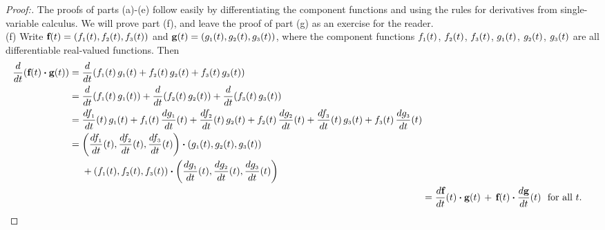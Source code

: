 \begin{proofbar}\vspace{-3mm}\begin{proof}[Proof:]
 The proofs of parts (a)-(e) follow easily by differentiating the component functions and using the rules for
 derivatives from single-variable calculus. We will prove part (f), and leave the proof of part (g) as an exercise for
 the reader.\vspace{1mm}\\(f)
 Write $\textbf{f}(t) = ( f_{\scriptscriptstyle 1}(t),f_{\scriptscriptstyle 2}(t),f_{\scriptscriptstyle 3}(t) )$ and
 $\textbf{g}(t) = ( g_{\scriptscriptstyle 1}(t),g_{\scriptscriptstyle 2}(t),g_{\scriptscriptstyle 3}(t) )$, where the component functions
 $f_{\scriptscriptstyle 1}(t)$, $f_{\scriptscriptstyle 2}(t)$, $f_{\scriptscriptstyle 3}(t)$, $g_{\scriptscriptstyle 1}(t)$, $g_{\scriptscriptstyle 2}(t)$, $g_{\scriptscriptstyle 3}(t)$ are all
 differentiable real-valued functions. Then
 \begin{align*}\begin{split}
  \dfrac{d}{dt} ( \textbf{f}(t) \bm{\cdot} \textbf{g}(t) ) &= \dfrac{d}{dt} ( f_{\scriptscriptstyle 1}(t)\,g_{\scriptscriptstyle 1}(t) +
   f_{\scriptscriptstyle 2}(t)\,g_{\scriptscriptstyle 2}(t) + f_{\scriptscriptstyle 3}(t)\,g_{\scriptscriptstyle 3}(t) )\\
  &= \dfrac{d}{dt} ( f_{\scriptscriptstyle 1}(t)\,g_{\scriptscriptstyle 1}(t) ) +
   \dfrac{d}{dt} ( f_{\scriptscriptstyle 2}(t)\,g_{\scriptscriptstyle 2}(t) ) + \dfrac{d}{dt} ( f_{\scriptscriptstyle 3}(t)\,g_{\scriptscriptstyle 3}(t) )\\
  &= \dfrac{df_{\scriptscriptstyle 1}}{dt}(t)\,g_{\scriptscriptstyle 1}(t) + f_{\scriptscriptstyle 1}(t)\,\dfrac{dg_{\scriptscriptstyle 1}}{dt}(t) +
   \dfrac{df_{\scriptscriptstyle 2}}{dt}(t)\,g_{\scriptscriptstyle 2}(t) + f_{\scriptscriptstyle 2}(t)\,\dfrac{dg_{\scriptscriptstyle 2}}{dt}(t) +
   \dfrac{df_{\scriptscriptstyle 3}}{dt}(t)\,g_{\scriptscriptstyle 3}(t) + f_{\scriptscriptstyle 3}(t)\,\dfrac{dg_{\scriptscriptstyle 3}}{dt}(t)\\
  &= \biggl( \dfrac{df_{\scriptscriptstyle 1}}{dt}(t),\dfrac{df_{\scriptscriptstyle 2}}{dt}(t),\dfrac{df_{\scriptscriptstyle 3}}{dt}(t) \biggr) \bm{\cdot} 
   ( g_{\scriptscriptstyle 1}(t),g_{\scriptscriptstyle 2}(t),g_{\scriptscriptstyle 3}(t) )\\
   &\mathrel{\phantom{=}} {} + ( f_{\scriptscriptstyle 1}(t),f_{\scriptscriptstyle 2}(t),f_{\scriptscriptstyle 3}(t) ) \bm{\cdot} 
   \biggl( \dfrac{dg_{\scriptscriptstyle 1}}{dt}(t),\dfrac{dg_{\scriptscriptstyle 2}}{dt}(t),\dfrac{dg_{\scriptscriptstyle 3}}{dt}(t) \biggr)\end{split}\\
  &= \dfrac{d\textbf{f}}{dt}(t) \bm{\cdot} \textbf{g}(t) \,+\, \textbf{f}(t) \bm{\cdot} \dfrac{d\textbf{g}}{dt}(t)
   \text{~~for all $t$.} \qedhere
 \end{align*}
\end{proof}\vspace{-3mm}\end{proofbar}

